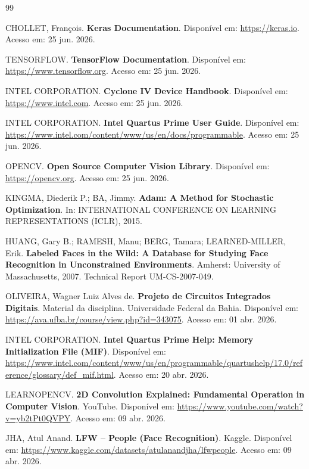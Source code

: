 \begin{thebibliography}{99}

CHOLLET, François.
\textbf{Keras Documentation}.
Disponível em:
\url{https://keras.io}.
Acesso em: 25 jun. 2026.

TENSORFLOW.
\textbf{TensorFlow Documentation}.
Disponível em:
\url{https://www.tensorflow.org}.
Acesso em: 25 jun. 2026.

INTEL CORPORATION.
\textbf{Cyclone IV Device Handbook}.
Disponível em:
\url{https://www.intel.com}.
Acesso em: 25 jun. 2026.

INTEL CORPORATION.
\textbf{Intel Quartus Prime User Guide}.
Disponível em:
\url{https://www.intel.com/content/www/us/en/docs/programmable}.
Acesso em: 25 jun. 2026.

OPENCV.
\textbf{Open Source Computer Vision Library}.
Disponível em:
\url{https://opencv.org}.
Acesso em: 25 jun. 2026.

KINGMA, Diederik P.; BA, Jimmy.
\textbf{Adam: A Method for Stochastic Optimization}.
In: INTERNATIONAL CONFERENCE ON LEARNING REPRESENTATIONS (ICLR), 2015.

HUANG, Gary B.; RAMESH, Manu; BERG, Tamara;
LEARNED-MILLER, Erik.
\textbf{Labeled Faces in the Wild: A Database for Studying Face Recognition in Unconstrained Environments}.
Amherst: University of Massachusetts, 2007.
Technical Report UM-CS-2007-049.

OLIVEIRA, Wagner Luiz Alves de.
\textbf{Projeto de Circuitos Integrados Digitais}.
Material da disciplina.
Universidade Federal da Bahia.
Disponível em:
\url{https://ava.ufba.br/course/view.php?id=343075}.
Acesso em: 01 abr. 2026.

INTEL CORPORATION.
\textbf{Intel Quartus Prime Help: Memory Initialization File (MIF)}.
Disponível em:
\url{https://www.intel.com/content/www/us/en/programmable/quartushelp/17.0/reference/glossary/def_mif.html}.
Acesso em: 20 abr. 2026.

LEARNOPENCV.
\textbf{2D Convolution Explained: Fundamental Operation in Computer Vision}.
YouTube.
Disponível em:
\url{https://www.youtube.com/watch?v=yb2tPt0QVPY}.
Acesso em: 09 abr. 2026.

JHA, Atul Anand.
\textbf{LFW -- People (Face Recognition)}.
Kaggle.
Disponível em:
\url{https://www.kaggle.com/datasets/atulanandjha/lfwpeople}.
Acesso em: 09 abr. 2026.


\end{thebibliography}

